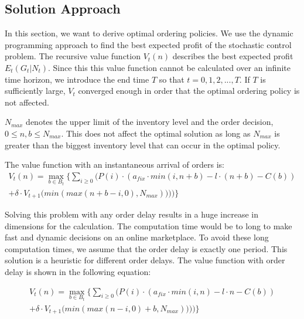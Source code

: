 \subsection{Solution Approach}
In this section, we want to derive optimal ordering policies.
We use the dynamic programming approach to find the best expected profit of the stochastic control problem.
The recursive value function $V_t(n)$ describes the best expected profit $E_t(G_t | N_t)$.
Since this this value function cannot be calculated over an infinite time horizon, we introduce the end time $T$ so that $t = 0, 1, 2, ..., T$.
If $T$ is sufficiently large, $V_t$ converged enough in order that the optimal ordering policy is not affected.

$N_{max}$ denotes the upper limit of the inventory level and the order decision, $0 \leq n, b \leq N_{max}$. This does not affect the optimal solution as long as $N_{max}$ is greater than the biggest inventory level that can occur in the optimal policy.

The value function with an instantaneous arrival of orders is:
\begin{equation}
\begin{split}
V_t(n) = \max_{b \in B_t} \Bigg\{
\sum_{i \geq 0} \Big(
P(i) \cdot (
a_{fix} \cdot min(i, n + b) %
- l \cdot (n + b) %
- C(b) %
) \\
+ \delta \cdot V_{t+1}\big(min(max(n + b - i, 0), N_{max}))\big)
\Big)\Bigg\}
\end{split}
\label{eq:dyn_prog_no_delay}
\end{equation}

Solving this problem with any order delay results in a huge increase in dimensions for the calculation.
The computation time would be to long to make fast and dynamic decisions on an online marketplace.
To avoid these long computation times, we assume that the order delay is exactly one period.
This solution is a heuristic for different order delays.
The value function with order delay is shown in the following equation:

\begin{equation}
\begin{split}
V_t(n) = \max_{b \in B_t} \Bigg\{
	\sum_{i \geq 0} \Big(
		P(i) \cdot (
			a_{fix} \cdot min(i, n) %
			- l \cdot n %
			- C(b) %
		) \\
		+ \delta \cdot V_{t+1}\big(min(max(n - i, 0) + b, N_{max}))\big)
	\Big)\Bigg\}
\end{split}
\label{eq:dyn_prog}
\end{equation}

